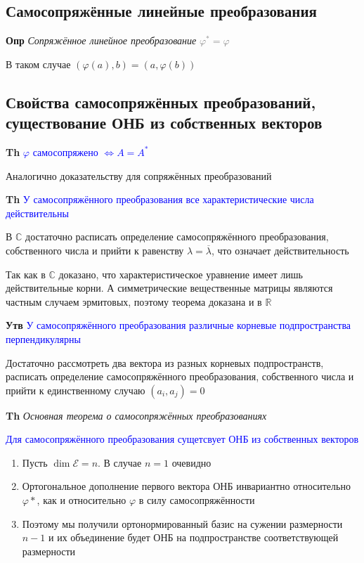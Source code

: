 \documentclass[a4paper, 14pt]{article}
\begin{document}
    \subsection{Самосопряжённые линейные преобразования}
    
    \textbf{Опр} \textit{Сопряжённое линейное преобразование} \textcolor{gray}{$\varphi^* = \varphi$}
    
    В таком случае $(\varphi (a), b) = (a, \varphi(b))$
    
    \subsection{Свойства самосопряжённых преобразований, существование ОНБ из собственных векторов}
    
    \textbf{Th} \textcolor{blue}{$\varphi$ самосопряжено $\Leftrightarrow A = A^*$}
    
    Аналогично доказательству для сопряжённых преобразований
    
    \textbf{Th} \textcolor{blue}{У самосопряжённого преобразования все характеристические числа действительны}
    
    В $\mathbb{C}$ достаточно расписать определение самосопряжённого преобразования, собственного числа и прийти к
    равенству $\lambda = \overline{\lambda}$, что означает действительность
    
    Так как в $\mathbb{C}$ доказано, что характеристическое уравнение имеет лишь действительные корни.
    А симметрические вещественные матрицы являются частным случаем эрмитовых, поэтому теорема доказана и в $\mathbb{R}$
    
    \textbf{Утв} \textcolor{blue}{У самосопряжённого преобразования различные корневые подпространства перпендикулярны}
    
    Достаточно рассмотреть два вектора из разных корневых подпространств, расписать определение самосопряжённого
    преобразования, собственного числа и прийти к единственному случаю $(a_i, a_j) = 0$
    
    \textbf{Th} \textit{Основная теорема о самосопряжённых преобразованиях}
    
    \textcolor{blue}{Для самосопряжённого преобразования сущетсвует ОНБ из собственных векторов}
    
    \begin{enumerate}
        \item Пусть $\dim \mathscr{E} = n$.
        В случае $n = 1$ очевидно
        \item Ортогональное дополнение первого вектора ОНБ инвариантно относительно $\varphi*$, как и относительно $\varphi$ в
        силу самосопряжённости
        \item Поэтому мы получили ортонормированный базис на сужении размерности $n - 1$ и их объединение будет ОНБ на
        подпространстве соответствующей размерности
    \end{enumerate}
    
\end{document}
